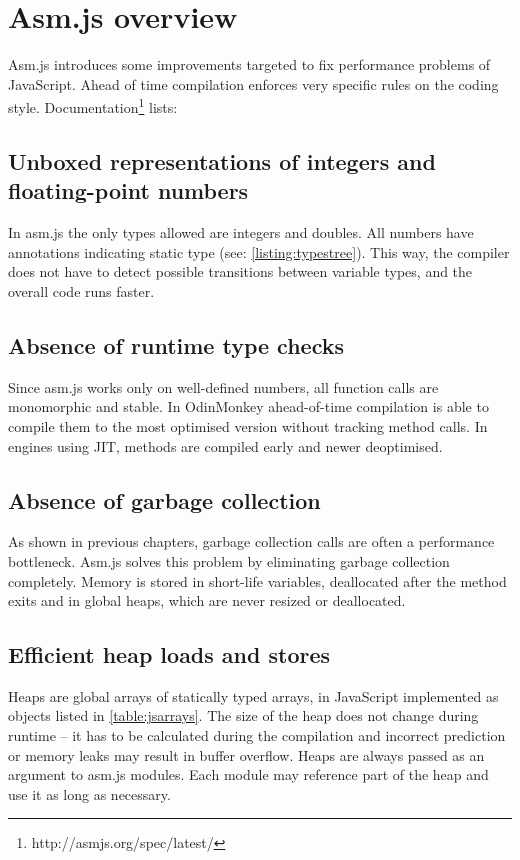 \section{Asm.js overview}
\label{sec:asmjsoverview}

Asm.js introduces some improvements targeted to fix performance problems of JavaScript. Ahead of time compilation enforces very specific rules on the coding style. Documentation\footnote{http://asmjs.org/spec/latest/} lists:

\subsection{Unboxed representations of integers and floating-point numbers}
\label{sec:asmjsunboxed}
In asm.js the only types allowed are integers and doubles. All numbers have annotations indicating static type (see: \ref{listing:typestree}). This way, the compiler does not have to detect possible transitions between variable types, and the overall code runs faster.

\subsection{Absence of runtime type checks}
\label{sec:asmjstypechecks}
Since asm.js works only on well-defined numbers, all function calls are monomorphic and stable. In OdinMonkey ahead-of-time compilation is able to compile them to the most optimised version without tracking method calls. In engines using JIT, methods are compiled early and newer deoptimised.

\subsection{Absence of garbage collection}
\label{sec:asmjsgc}
As shown in previous chapters, garbage collection calls are often a performance bottleneck. Asm.js solves this problem by eliminating garbage collection completely. Memory is stored in short-life variables, deallocated after the method exits and in global heaps, which are never resized or deallocated.

\subsection{Efficient heap loads and stores}
\label{sec:asmjsheap}

Heaps are global arrays of statically typed arrays, in JavaScript implemented as objects listed in \ref{table:jsarrays}. The size of the heap does not change during runtime -- it has to be calculated during the compilation and incorrect prediction or memory leaks may result in buffer overflow. Heaps are always passed as an argument to asm.js modules. Each module may reference part of the heap and use it as long as necessary.

